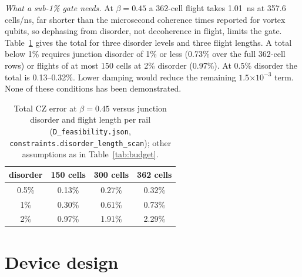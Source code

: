 \documentclass[10pt,twocolumn,letterpaper]{article}
\newcommand{\ee}[1]{\ensuremath{\times10^{#1}}}
\newcommand{\file}[1]{\texttt{#1}}
\begin{document}
\emph{What a sub-1\% gate needs.} At $\beta=0.45$ a 362-cell flight takes 1.01~ns at 357.6 cells/ns, far shorter than
the microsecond coherence times reported for vortex qubits, so dephasing from disorder, not decoherence in flight,
limits the gate. Table~\ref{tab:disorder} gives the total for three disorder levels and three flight lengths. A total
below 1\% requires junction disorder of 1\% or less (0.73\% over the full 362-cell rows) or flights of at most 150
cells at 2\% disorder (0.97\%). At 0.5\% disorder the total is 0.13--0.32\%. Lower damping would reduce the remaining
$1.5\ee{-3}$ term. None of these conditions has been demonstrated.

\begin{table}[t]
\centering\footnotesize
\caption{Total CZ error at $\beta=0.45$ versus junction disorder and flight length per rail (\file{D\_\allowbreak{}feasibility.\allowbreak{}json},
\file{constraints.\allowbreak{}disorder\_\allowbreak{}length\_\allowbreak{}scan}); other assumptions as in Table~\ref{tab:budget}.}
\label{tab:disorder}
\begin{tabular}{@{}cccc@{}}
\toprule
disorder & 150 cells & 300 cells & 362 cells\\
\midrule
0.5\% & 0.13\% & 0.27\% & 0.32\%\\
1\% & 0.30\% & 0.61\% & 0.73\%\\
2\% & 0.97\% & 1.91\% & 2.29\%\\
\bottomrule
\end{tabular}
\end{table}

\section{Device design}
\label{sec:device}
\end{document}
